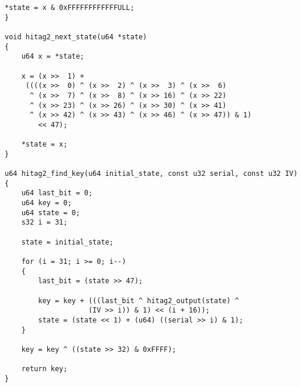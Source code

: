 \begin{lstlisting}[frame=tb]
	*state = x & 0xFFFFFFFFFFFFULL;
}

void hitag2_next_state(u64 *state)
{
	u64 x = *state;

	x = (x >>  1) +
	 ((((x >>  0) ^ (x >>  2) ^ (x >>  3) ^ (x >>  6)
	  ^ (x >>  7) ^ (x >>  8) ^ (x >> 16) ^ (x >> 22)
	  ^ (x >> 23) ^ (x >> 26) ^ (x >> 30) ^ (x >> 41)
	  ^ (x >> 42) ^ (x >> 43) ^ (x >> 46) ^ (x >> 47)) & 1) 
	  	<< 47);

	*state = x;
}

u64 hitag2_find_key(u64 initial_state, const u32 serial, const u32 IV)
{
	u64 last_bit = 0;
	u64 key = 0;
	u64 state = 0;
	s32 i = 31;

	state = initial_state;

	for (i = 31; i >= 0; i--)
	{
		last_bit = (state >> 47);

		key = key + (((last_bit ^ hitag2_output(state) ^ 
					(IV >> i)) & 1) << (i + 16));
		state = (state << 1) + (u64) ((serial >> i) & 1);
	}
	
	key = key ^ ((state >> 32) & 0xFFFF);
	
	return key;
}
\end{lstlisting}
